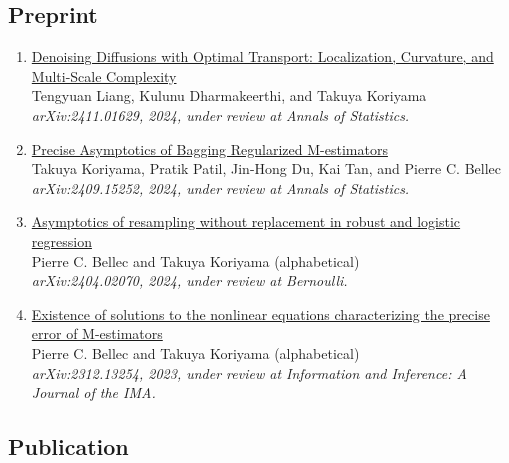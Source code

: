 \documentclass[10pt]{amsart}
\begin{document}
\subsection*{Preprint}
\begin{enumerate}
\item \href{https://arxiv.org/abs/2411.01629}{Denoising Diffusions with Optimal Transport: Localization, Curvature, and Multi-Scale Complexity}\\
Tengyuan Liang, Kulunu Dharmakeerthi, and Takuya Koriyama \\
\textit{arXiv:2411.01629, 2024, under review at Annals of Statistics.}

\item \href{https://arxiv.org/abs/2409.15252}{Precise Asymptotics of Bagging Regularized M-estimators}\\
Takuya Koriyama, Pratik Patil, Jin-Hong Du, Kai Tan, and Pierre C. Bellec \\
\textit{arXiv:2409.15252, 2024, under review at Annals of Statistics.}

\item \href{https://arxiv.org/abs/2404.02070}{Asymptotics of resampling without replacement in robust and logistic regression}\\
Pierre C. Bellec and Takuya Koriyama (alphabetical)\\
\textit{arXiv:2404.02070, 2024, under review at Bernoulli.}

\item \href{https://arxiv.org/abs/2312.13254}{Existence of solutions to the nonlinear equations characterizing the precise error of M-estimators}\\
Pierre C. Bellec and Takuya Koriyama (alphabetical)\\
\textit{arXiv:2312.13254, 2023, under review at Information and Inference: A Journal of the IMA.}
\end{enumerate}

\subsection*{Publication}
\end{document}

